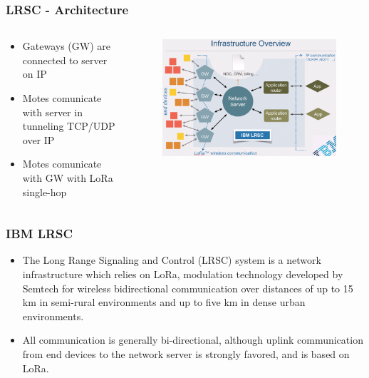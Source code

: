 \begin{frame}[fragile]
  \frametitle{LRSC - Architecture}
  \begin{columns}
    \begin{column}{.48\linewidth}
    	\begin{itemize}
	  \item Gateways (GW) are connected to server on IP
	  \item Motes comunicate with server in tunneling TCP/UDP over IP
	  \item Motes comunicate with GW with LoRa single-hop
    	\end{itemize}
    \end{column}
    \hfill
    \begin{column}{.48\linewidth}
    	\begin{figure}
	  \centering
	  \includegraphics[width=\linewidth]{img/LRSC_infrastructure.png}
    	\end{figure}

    \end{column}
  \end{columns}
\end{frame}

\begin{frame}[fragile]
  \frametitle{IBM LRSC}
    	\begin{itemize}
	  \item The Long Range Signaling and Control (LRSC) system is a network infrastructure which relies on LoRa\texttrademark, modulation technology developed by Semtech for wireless bidirectional communication over distances of up to 15 km in semi-rural environments and up to five km in dense urban environments.
	  \item All communication is generally bi-directional, although uplink communication from end devices to the network server is strongly favored, and is based on LoRa.
    	\end{itemize}
   
\end{frame}


